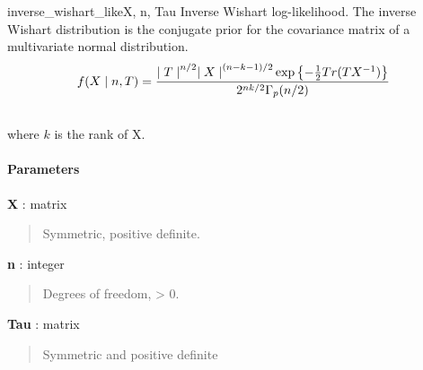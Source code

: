 \hypertarget{pymc.distributions.inverse_wishart_like}{}
\begin{funcdesc}{inverse\_wishart\_like}{X, n, Tau}
Inverse Wishart log-likelihood. The inverse Wishart distribution is the conjugate
prior for the covariance matrix of a multivariate normal distribution.
\begin{gather}
\begin{split}f(X \mid n, T) = \frac{{\mid T \mid}^{n/2}{\mid X \mid}^{(n-k-1)/2} \exp\left\{ -\frac{1}{2} Tr(TX^{-1}) \right\}}{2^{nk/2} \Gamma_p(n/2)}\end{split}\notag\\\begin{split}\end{split}\notag
\end{gather}
where $k$ is the rank of X.
\paragraph{Parameters}\begin{paramlist}

\item[] \textbf{X} : matrix
\begin{quote}

Symmetric, positive definite.
\end{quote}

\item[] \textbf{n} : integer
\begin{quote}

Degrees of freedom, \textgreater{} 0.
\end{quote}

\item[] \textbf{Tau} : matrix
\begin{quote}

Symmetric and positive definite
\end{quote}
\end{paramlist}
\end{funcdesc}

